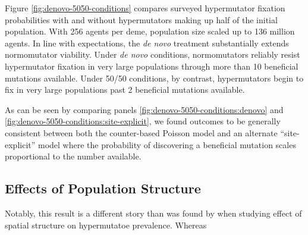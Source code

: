 Figure \ref{fig:denovo-5050-conditions} compares surveyed hypermutator fixation probabilities with and without hypermutators making up half of the initial population.
With 256 agents per deme, population size scaled up to 136 million agents.
In line with expectations, the \textit{de novo} treatment substantially extends normomutator viability.
Under \textit{de novo} conditions, normomutators reliably resist hypermutator fixation in very large populations through more than 10 beneficial mutations available.
Under 50/50 conditions, by contrast, hypermutators begin to fix in very large populations past 2 beneficial mutations available.

As can be seen by comparing panels \ref{fig:denovo-5050-conditions:denovo} and \ref{fig:denovo-5050-conditions:site-explicit}, we found outcomes to be generally consistent between both the counter-based Poisson model and an alternate ``site-explicit'' model where the probability of discovering a beneficial mutation scales proportional to the number available.

\subsection{Effects of Population Structure}
\label{sec:population-structure}



Notably, this result is a different story than was found by \citet{raynes2019migration} when studying effect of spatial structure on hypermutatoe prevalence.
Whereas

